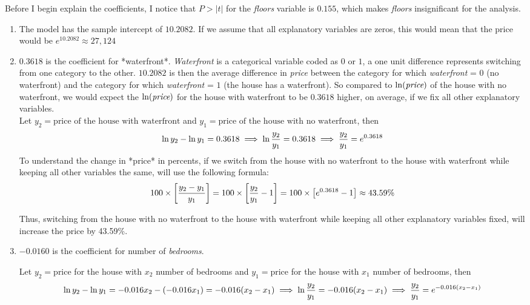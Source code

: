 \documentclass[12pt]{article}
\begin{document}
 Before I begin explain the coefficients, I notice that $P>|t|$ for the {\it floors} variable is $0.155$, which makes  {\it floors} insignificant for the analysis. 
 \begin{enumerate}
 	\item  The model has the sample intercept of $10.2082$.
If we assume that all explanatory variables are zeros, this would mean that the price would be $e^{10.2082}\approx 27,124$
 \item  $0.3618$ is the coefficient for *waterfront*.
 {\it Waterfront} is a categorical variable coded as $0$ or $1$, a one unit difference represents switching from one category to the other. $10.2082$ is then the average difference in  {\it price} between the category for which  {\it waterfront} = \(0\) (no waterfront) and the category for which  {\it waterfront} = \(1\) (the house has a waterfront). So compared to $\ln(\text{\it price})$ of the house with no waterfront, we would expect the $\ln(\text{\it price})$ for the house with waterfront to be $0.3618$ higher, on average, if we fix all other explanatory variables.\\
Let $y_2 = \text{price of the house with waterfront}$   and $y_1 = \text{price of the house with no waterfront}$, then 
$$
\large
\ln y_2 - \ln y_1 = 0.3618 \implies \ln \frac{y_2}{y_1} = 0.3618 \implies \frac{y_2}{y_1} = e^{0.3618}$$
To understand the change in *price* in percents, if we switch from the house with no waterfront to the house with waterfront while keeping all other variables the same, will use the following formula:
$$
\large
100\times \left[\frac{y_2-y_1}{y_1}\right]= 100\times \left[\frac{y_2}{y_1} - 1\right] = 100\times \left[ e^{0.3618} - 1\right] \approx 43.59\%$$

Thus, switching from the house with no waterfront to the house with waterfront while keeping all other explanatory variables fixed, will increase the price by 43.59\%.

 \item  $-0.0160$ is the coefficient for number of {\it bedrooms}.

Let $y_2 = \text{price}$ for the house with $x_2$ number of bedrooms and $y_1 = \text{price}$ for the house with $x_1$ number of bedrooms, then 
$$
\large
\ln y_2 - \ln y_1 = -0.016 x_2 - (-0.016 x_1) = -0.016 (x_2 - x_1) \implies \ln\frac{y_2}{y_1} = -0.016 (x_2-x_1)\implies \frac{y_2}{y_1} = e^{-0.016(x_2-x_1)}$$


\end{enumerate}
\end{document}
